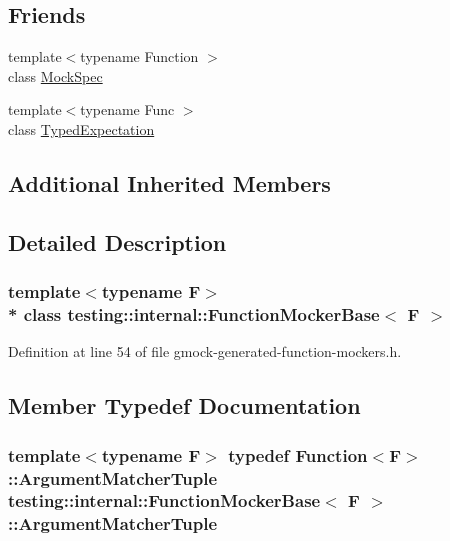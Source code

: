 \subsection*{Friends}
\begin{DoxyCompactItemize}
\item 
{\footnotesize template$<$typename Function $>$ }\\class \hyperlink{classtesting_1_1internal_1_1_function_mocker_base_ae72aeee91c93e8ae5e1ed7f726a766b2}{Mock\+Spec}
\item 
{\footnotesize template$<$typename Func $>$ }\\class \hyperlink{classtesting_1_1internal_1_1_function_mocker_base_a4f17de55396a8ef740d5ad2b1380a851}{Typed\+Expectation}
\end{DoxyCompactItemize}
\subsection*{Additional Inherited Members}


\subsection{Detailed Description}
\subsubsection*{template$<$typename F$>$\\*
class testing\+::internal\+::\+Function\+Mocker\+Base$<$ F $>$}



Definition at line 54 of file gmock-\/generated-\/function-\/mockers.\+h.



\subsection{Member Typedef Documentation}
\subsubsection[{\texorpdfstring{Argument\+Matcher\+Tuple}{ArgumentMatcherTuple}}]{\setlength{\rightskip}{0pt plus 5cm}template$<$typename F$>$ typedef {\bf Function}$<$F$>$\+::{\bf Argument\+Matcher\+Tuple} {\bf testing\+::internal\+::\+Function\+Mocker\+Base}$<$ F $>$\+::{\bf Argument\+Matcher\+Tuple}}\hypertarget{classtesting_1_1internal_1_1_function_mocker_base_ab790bcb1dcf57fa6659365386723ae5a}{}\label{classtesting_1_1internal_1_1_function_mocker_base_ab790bcb1dcf57fa6659365386723ae5a}



